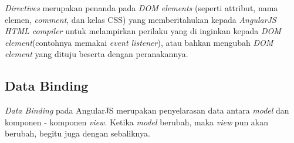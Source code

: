 		\textit{Directives} merupakan penanda pada \textit{DOM elements} (seperti attribut, nama elemen, \textit{comment},  dan kelas CSS) yang memberitahukan kepada \textit{AngularJS HTML compiler} untuk melampirkan perilaku yang di inginkan kepada \textit{DOM element}(contohnya memakai \textit{event listener}), atau bahkan mengubah \textit{DOM element} yang dituju beserta dengan peranakannya.
		
		
		
	
	
	\subsection{Data Binding}
	\label{sub: dataBinding}
		
		\textit{Data Binding} pada AngularJS merupakan penyelarasan data antara \textit{model} dan komponen - komponen \textit{view}. Ketika \textit{model} berubah, maka \textit{view} pun akan berubah, begitu juga dengan sebaliknya.
		
